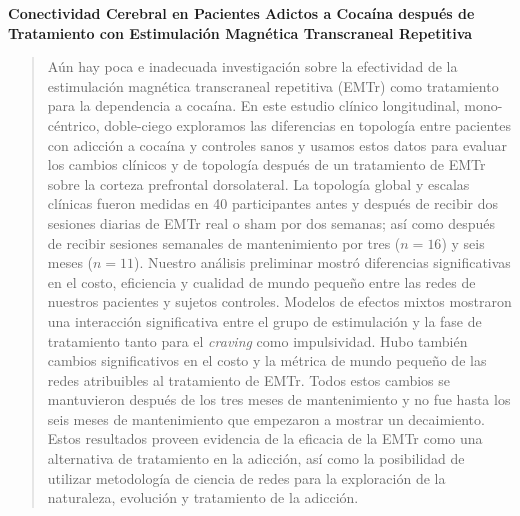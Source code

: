 \begin{center}
    \large\textbf{Conectividad Cerebral en Pacientes Adictos a Cocaína después de
     Tratamiento con Estimulación Magnética Transcraneal Repetitiva}
\end{center}
\begin{quotation}
    \noindent
    Aún hay poca e inadecuada investigación sobre la efectividad de la estimulación magnética transcraneal repetitiva (EMTr) como tratamiento para la dependencia a cocaína. En este estudio clínico longitudinal, mono-céntrico, doble-ciego exploramos las diferencias en topología entre pacientes con adicción a cocaína y controles sanos y usamos estos datos para evaluar los cambios clínicos y de topología después de un tratamiento de EMTr sobre la corteza prefrontal dorsolateral. La topología global y escalas clínicas fueron medidas en 40 participantes antes y después de recibir dos sesiones diarias de EMTr real o sham por dos semanas; así como después de recibir sesiones semanales de mantenimiento por tres ($n=16$) y seis meses ($n=11$). Nuestro análisis preliminar mostró diferencias significativas en el costo, eficiencia y cualidad de mundo pequeño entre las redes de nuestros pacientes y sujetos controles. Modelos de efectos mixtos mostraron una interacción significativa entre el grupo de estimulación y la fase de tratamiento tanto para el \textit{craving} como impulsividad. Hubo también cambios significativos en el costo y la métrica de mundo pequeño de las redes atribuibles al tratamiento de EMTr. Todos estos cambios se mantuvieron después de los tres meses de mantenimiento y no fue hasta los seis meses de mantenimiento que empezaron a mostrar un decaimiento. Estos resultados proveen evidencia de la eficacia de la EMTr como una alternativa de tratamiento en la adicción, así como la posibilidad de utilizar metodología de ciencia de redes para la exploración de la naturaleza, evolución y tratamiento de la adicción.
\end{quotation}
\clearpage
